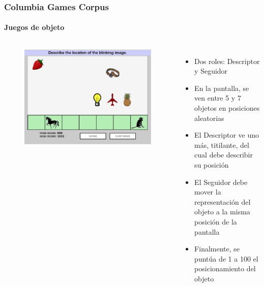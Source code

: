 \documentclass{beamer}
\begin{document}
\begin{frame}
  \frametitle{Columbia Games Corpus}
  \framesubtitle{Juegos de objeto}
  \begin{columns}
      \begin{figure}
        \includegraphics[width=\textwidth]{images/columbia_games_color.jpg}
      \end{figure}


    \begin{itemize}
      \item Dos roles: Descriptor y Seguidor
      \item En la pantalla, se ven entre 5 y 7 objetos en posiciones aleatorias
      \item El Descriptor ve uno más, titilante, del cual debe describir su posición
      \item El Seguidor debe mover la representación del objeto a la misma posición de la pantalla
      \item Finalmente, se puntúa de 1 a 100 el posicionamiento del objeto
    \end{itemize}
  \end{columns}
\end{frame}




\newcommand{\socialvariable}[1] {\emph{#1}\xspace}
\newcommand{\svcontributes} {\socialvariable{contributes-to-completion}}
\newcommand{\svclear} {\socialvariable{making-self-clear}}
\newcommand{\svengaged} {\socialvariable{engaged-with-game}}
\newcommand{\svplanning} {\socialvariable{planning-what-to-say}}
\newcommand{\svencourages} {\socialvariable{gives-encouragement}}
\newcommand{\svdifficult} {\socialvariable{difficult-for-partner-to-speak}}
\newcommand{\svbored} {\socialvariable{bored-with-game}}
\newcommand{\svdislikes} {\socialvariable{dislikes-partner}}
\end{document}
